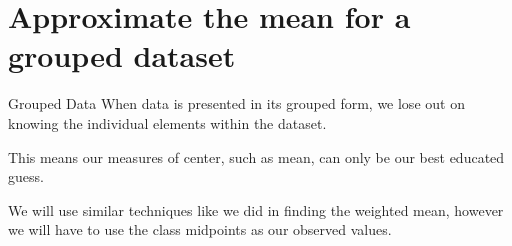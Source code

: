 \documentclass[t]{beamer}
\begin{document}
\section{Approximate the mean for a grouped dataset}

\begin{frame}{Grouped Data}
When data is presented in its grouped form, we lose out on knowing the individual elements within the dataset. \newline\\	\pause

This means our measures of center, such as mean, can only be our best educated guess.	\newline\\	\pause

We will use similar techniques like we did in finding the weighted mean, however we will have to use the class midpoints as our observed values.
\end{frame}
\end{document}
